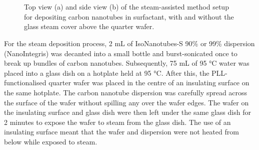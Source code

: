\documentclass[
  a4paper,
]{scrbook}
\begin{document}
\begin{figure}
\begin{minipage}[t]{0.03\linewidth}
{{}

}

\end{minipage}%
%
\begin{minipage}[t]{0.01\linewidth}

{\centering 

~

}

\end{minipage}%
%
\begin{minipage}[t]{0.45\linewidth}

{\centering 


}

\end{minipage}%
%
\begin{minipage}[t]{0.01\linewidth}

{\centering 

~

}

\end{minipage}%

\caption[Top and side view of the steam-assisted method setup for
depositing carbon nanotubes in
surfactant.]{\label{fig-steaming-method}Top view (a) and side view (b)
of the steam-assisted method setup for depositing carbon nanotubes in
surfactant, with and without the glass steam cover above the quarter
wafer.}

\end{figure}

For the steam deposition process, 2 mL of IsoNanotubes-S 90\% or 99\%
dispersion (NanoIntegris) was decanted into a small bottle and
burst-sonicated once to break up bundles of carbon nanotubes.
Subsequently, 75 mL of 95 °C water was placed into a glass dish on a
hotplate held at 95 °C. After this, the PLL-functionalised quarter wafer
was placed in the centre of an insulating surface on the same hotplate.
The carbon nanotube dispersion was carefully spread across the surface
of the wafer without spilling any over the wafer edges. The wafer on the
insulating surface and glass dish were then left under the same glass
dish for 2 minutes to expose the wafer to steam from the glass dish. The
use of an insulating surface meant that the wafer and dispersion were
not heated from below while exposed to steam.
\end{document}
